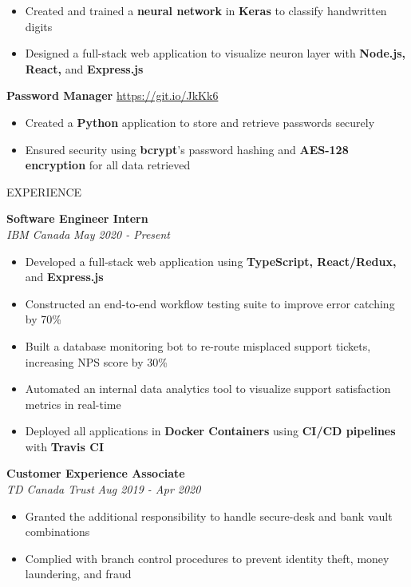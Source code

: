 \documentclass[letterpaper,11pt,oneside]{article}
\newcommand{\createHeading}[1]{
    \vspace{1.25em}
    \hline
    \vspace{-1.5ex}
    \begin{center}
        #1
    \end{center}
    \vspace{-1.5ex}
    \hline
    \vspace{1.25em}
}
\begin{document}
\begin{addmargin}[.6em]{.6em}
\begin{itemize}
        \item Created and trained a \textbf{neural network} in \textbf{Keras} to classify handwritten digits
        \item Designed a full-stack web application to visualize neuron layer with \textbf{Node.js, React,} and \textbf{Express.js} 
    \end{itemize}
    \vspace{1.25em}
    \textbf{Password Manager} \hfill \href{https://git.io/JkKk6}{https://git.io/JkKk6}
    \begin{itemize}
        \item Created a \textbf{Python} application to store and retrieve passwords securely
        \item Ensured security using \textbf{bcrypt}'s password hashing and \textbf{AES-128 encryption} for all data retrieved
    \end{itemize}
\end{addmargin}

\createHeading{EXPERIENCE}
\begin{addmargin}[.6em]{.6em}
    \textbf{Software Engineer Intern} \\
    \textit{IBM Canada} \hfill \textit{May 2020 - Present}
    \begin{itemize}
        \item Developed a full-stack web application using \textbf{TypeScript, React/Redux,} and \textbf{Express.js}
        \item Constructed an end-to-end workflow testing suite to improve error catching by 70\%
        \item Built a database monitoring bot to re-route misplaced support tickets, increasing NPS score by 30\%
        \item Automated an internal data analytics tool to visualize support satisfaction metrics in real-time
        \item Deployed all applications in \textbf{Docker Containers} using \textbf{CI/CD pipelines} with \textbf{Travis CI}
    \end{itemize}
    \vspace{1.25em}
    \textbf{Customer Experience Associate} \\
    \textit{TD Canada Trust} \hfill \textit{Aug 2019 - Apr 2020}
    \begin{itemize}
        \item Granted the additional responsibility to handle secure-desk and bank vault combinations
        \item Complied with branch control procedures to prevent identity theft, money laundering, and fraud
    \end{itemize}
\end{addmargin}
\end{document}
